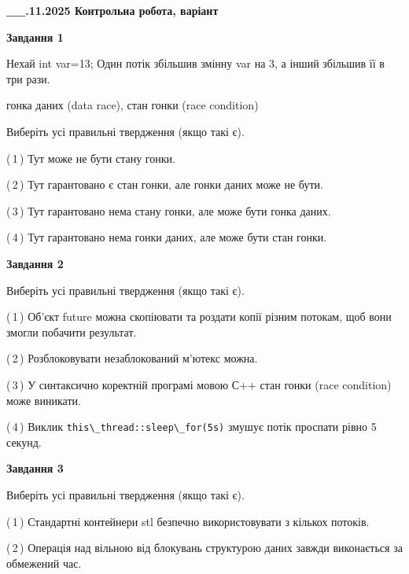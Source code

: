 \documentclass[12pt, ukrainian]{article}
\def\code#1{\Verb!#1!}
\begin{document}
\begin {large}

\textbf{\_\_.11.2025 Контрольна робота, варіант  }\par


{

\begin{center}
\textbf{Завдання 1}
\end{center}
Нехай int var=13; Один потік збільшив змінну var на 3, а інший збільшив її в три рази.

гонка даних (data race), стан гонки (race condition)

Виберіть усі правильні твердження (якщо такі є).\par
\vspace{2mm}
(\,1\,) Тут може не бути стану гонки.%

(\,2\,) Тут гарантовано є стан гонки, але гонки даних може не бути.%

(\,3\,) Тут гарантовано нема стану гонки, але може бути гонка даних.%

(\,4\,) Тут гарантовано нема гонки даних, але може бути стан гонки.%



\begin{center}
\textbf{Завдання 2}
\end{center}
Виберіть усі правильні твердження (якщо такі є).\par
\vspace{2mm}

(\,1\,) Об’єкт future можна скопіювати та роздати копії різним потокам, щоб вони змогли побачити результат.%

(\,2\,) Розблоковувати незаблокований м’ютекс можна.%

(\,3\,) У синтаксично коректній програмі мовою С++ стан гонки (race condition) може виникати.%

(\,4\,) Виклик \code{this\_thread::sleep\_for(5s)} змушує потік проспати рівно 5 секунд.%



\begin{center}
\textbf{Завдання 3}
\end{center}
Виберіть усі правильні твердження (якщо такі є).\par
\vspace{2mm}

(\,1\,) Стандартні контейнери stl безпечно використовувати з кількох потоків.%

(\,2\,) Операція над вільною від блокувань структурою даних завжди виконається за обмежений час.%

}
\end{large}
\end{document}
